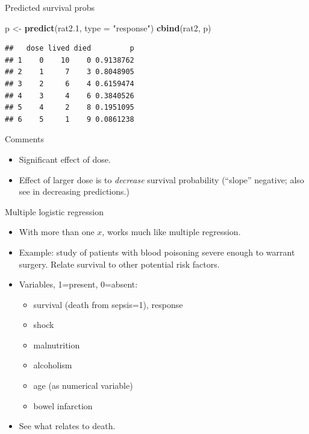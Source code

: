 \documentclass[ignorenonframetext,]{beamer}
\newenvironment{Shaded}{\begin{snugshade}}{\end{snugshade}}
\newcommand{\DataTypeTok}[1]{\textcolor[rgb]{0.13,0.29,0.53}{#1}}
\newcommand{\FloatTok}[1]{\textcolor[rgb]{0.00,0.00,0.81}{#1}}
\newcommand{\KeywordTok}[1]{\textcolor[rgb]{0.13,0.29,0.53}{\textbf{#1}}}
\newcommand{\NormalTok}[1]{#1}
\newcommand{\StringTok}[1]{\textcolor[rgb]{0.31,0.60,0.02}{#1}}
\providecommand{\tightlist}{%
  \setlength{\itemsep}{0pt}\setlength{\parskip}{0pt}}
\begin{document}
\begin{frame}[fragile]{Predicted survival probs}
\protect\hypertarget{predicted-survival-probs}{}

\begin{Shaded}
\begin{Highlighting}[]
\NormalTok{p <-}\StringTok{ }\KeywordTok{predict}\NormalTok{(rat2}\FloatTok{.1}\NormalTok{, }\DataTypeTok{type =} \StringTok{"response"}\NormalTok{)}
\KeywordTok{cbind}\NormalTok{(rat2, p)}
\end{Highlighting}
\end{Shaded}

\begin{verbatim}
##   dose lived died         p
## 1    0    10    0 0.9138762
## 2    1     7    3 0.8048905
## 3    2     6    4 0.6159474
## 4    3     4    6 0.3840526
## 5    4     2    8 0.1951095
## 6    5     1    9 0.0861238
\end{verbatim}

\end{frame}

\begin{frame}{Comments}
\protect\hypertarget{comments-11}{}

\begin{itemize}
\item
  Significant effect of dose.
\item
  Effect of larger dose is to \emph{decrease} survival probability
  (``slope'' negative; also see in decreasing predictions.)
\end{itemize}

\end{frame}

\begin{frame}{Multiple logistic regression}
\protect\hypertarget{multiple-logistic-regression}{}

\begin{itemize}
\item
  With more than one \(x\), works much like multiple regression.
\item
  Example: study of patients with blood poisoning severe enough to
  warrant surgery. Relate survival to other potential risk factors.
\item
  Variables, 1=present, 0=absent:

  \begin{itemize}
  \tightlist
  \item
    survival (death from sepsis=1), response
  \item
    shock
  \item
    malnutrition
  \item
    alcoholism
  \item
    age (as numerical variable)
  \item
    bowel infarction
  \end{itemize}
\item
  See what relates to death.
\end{itemize}

\end{frame}
\end{document}
